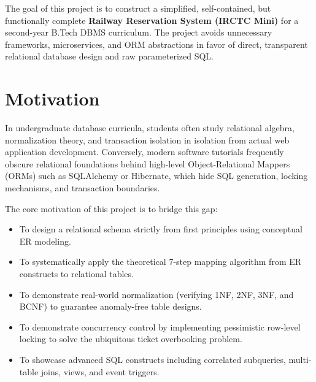 \documentclass[12pt,a4paper]{report}
\begin{document}
The goal of this project is to construct a simplified, self-contained, but functionally complete \textbf{Railway Reservation System (IRCTC Mini)} for a second-year B.Tech DBMS curriculum. The project avoids unnecessary frameworks, microservices, and ORM abstractions in favor of direct, transparent relational database design and raw parameterized SQL.

\section{Motivation}
In undergraduate database curricula, students often study relational algebra, normalization theory, and transaction isolation in isolation from actual web application development. Conversely, modern software tutorials frequently obscure relational foundations behind high-level Object-Relational Mappers (ORMs) such as SQLAlchemy or Hibernate, which hide SQL generation, locking mechanisms, and transaction boundaries.

The core motivation of this project is to bridge this gap:
\begin{itemize}
    \item To design a relational schema strictly from first principles using conceptual ER modeling.
    \item To systematically apply the theoretical 7-step mapping algorithm from ER constructs to relational tables.
    \item To demonstrate real-world normalization (verifying 1NF, 2NF, 3NF, and BCNF) to guarantee anomaly-free table designs.
    \item To demonstrate concurrency control by implementing pessimistic row-level locking to solve the ubiquitous ticket overbooking problem.
    \item To showcase advanced SQL constructs including correlated subqueries, multi-table joins, views, and event triggers.
\end{itemize}
\end{document}
